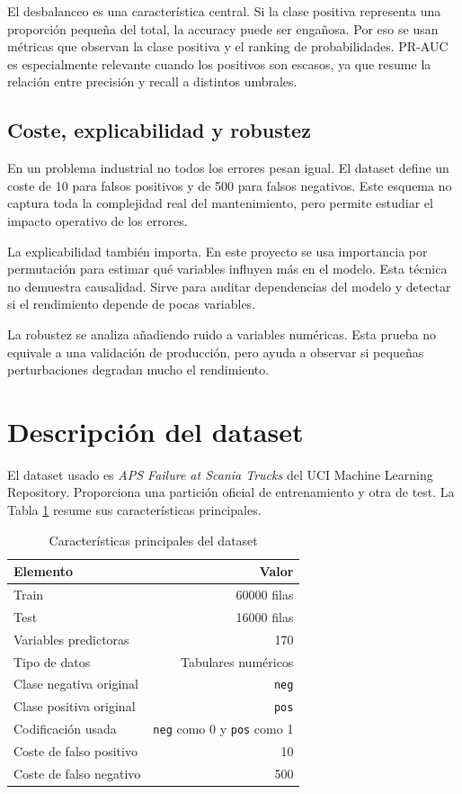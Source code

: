 \documentclass[11pt,a4paper]{article}
\begin{document}
El desbalanceo es una característica central. Si la clase positiva representa una proporción pequeña del total, la accuracy puede ser engañosa. Por eso se usan métricas que observan la clase positiva y el ranking de probabilidades. PR-AUC es especialmente relevante cuando los positivos son escasos, ya que resume la relación entre precisión y recall a distintos umbrales.

\subsection{Coste, explicabilidad y robustez}

En un problema industrial no todos los errores pesan igual. El dataset define un coste de 10 para falsos positivos y de 500 para falsos negativos. Este esquema no captura toda la complejidad real del mantenimiento, pero permite estudiar el impacto operativo de los errores.

La explicabilidad también importa. En este proyecto se usa importancia por permutación para estimar qué variables influyen más en el modelo. Esta técnica no demuestra causalidad. Sirve para auditar dependencias del modelo y detectar si el rendimiento depende de pocas variables.

La robustez se analiza añadiendo ruido a variables numéricas. Esta prueba no equivale a una validación de producción, pero ayuda a observar si pequeñas perturbaciones degradan mucho el rendimiento.

\section{Descripción del dataset}
\label{sec_dataset}

El dataset usado es \textit{APS Failure at Scania Trucks} del UCI Machine Learning Repository. Proporciona una partición oficial de entrenamiento y otra de test. La Tabla \ref{tab_dataset} resume sus características principales.

\begin{table}[H]
\centering
\caption{Características principales del dataset}
\label{tab_dataset}
\small
\begin{tabular}{@{}lr@{}}
\toprule
\textbf{Elemento} & \textbf{Valor}\\
\midrule
Train & 60000 filas\\
Test & 16000 filas\\
Variables predictoras & 170\\
Tipo de datos & Tabulares numéricos\\
Clase negativa original & \texttt{neg}\\
Clase positiva original & \texttt{pos}\\
Codificación usada & \texttt{neg} como 0 y \texttt{pos} como 1\\
Coste de falso positivo & 10\\
Coste de falso negativo & 500\\
\bottomrule
\end{tabular}
\end{table}
\end{document}
